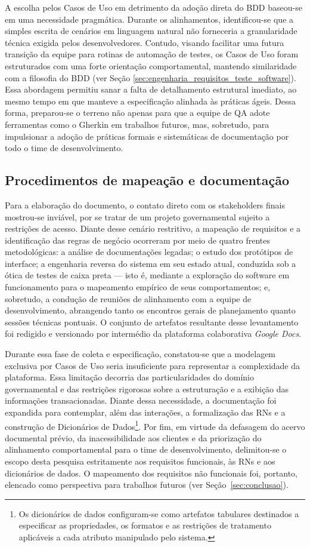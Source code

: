 A escolha pelos Casos de Uso em detrimento da adoção direta do BDD baseou-se em uma necessidade pragmática. Durante os alinhamentos, identificou-se que a simples escrita de cenários em linguagem natural não forneceria a granularidade técnica exigida pelos desenvolvedores. Contudo, visando facilitar uma futura transição da equipe para rotinas de automação de testes, os Casos de Uso foram estruturados com uma forte orientação comportamental, mantendo similaridade com a filosofia do BDD (ver Seção \ref{sec:engenharia_requisitos_teste_software}). Essa abordagem permitiu sanar a falta de detalhamento estrutural imediato, ao mesmo tempo em que manteve a especificação alinhada às práticas ágeis. Dessa forma, preparou-se o terreno não apenas para que a equipe de QA adote ferramentas como o Gherkin em trabalhos futuros, mas, sobretudo, para impulsionar a adoção de práticas formais e sistemáticas de documentação por todo o time de desenvolvimento.

\subsection{Procedimentos de mapeação e documentação}

Para a elaboração do documento, o contato direto com os stakeholders finais mostrou-se inviável, por se tratar de um projeto governamental sujeito a restrições de acesso. Diante desse cenário restritivo, a mapeação de requisitos e a identificação das regras de negócio ocorreram por meio de quatro frentes metodológicas: a análise de documentações legadas; o estudo dos protótipos de interface; a engenharia reversa do sistema em seu estado atual, conduzida sob a ótica de testes de caixa preta — isto é, mediante a exploração do software em funcionamento para o mapeamento empírico de seus comportamentos; e, sobretudo, a condução de reuniões de alinhamento com a equipe de desenvolvimento, abrangendo tanto os encontros gerais de planejamento quanto sessões técnicas pontuais. O conjunto de artefatos resultante desse levantamento foi redigido e versionado por intermédio da plataforma colaborativa \textit{Google Docs}.

Durante essa fase de coleta e especificação, constatou-se que a modelagem exclusiva por Casos de Uso seria insuficiente para representar a complexidade da plataforma. Essa limitação decorria das particularidades do domínio governamental e das restrições rigorosas sobre a estruturação e a exibição das informações transacionadas. Diante dessa necessidade, a documentação foi expandida para contemplar, além das interações, a formalização das RNs e a construção de Dicionários de Dados\footnote{Os dicionários de dados configuram-se como artefatos tabulares destinados a especificar as propriedades, os formatos e as restrições de tratamento aplicáveis a cada atributo manipulado pelo sistema.}. Por fim, em virtude da defasagem do acervo documental prévio, da inacessibilidade aos clientes e da priorização do alinhamento comportamental para o time de desenvolvimento, delimitou-se o escopo desta pesquisa estritamente aos requisitos funcionais, às RNs e aos dicionários de dados. O mapeamento dos requisitos não funcionais foi, portanto, elencado como perspectiva para trabalhos futuros (ver Seção~\ref{sec:conclusao}).

